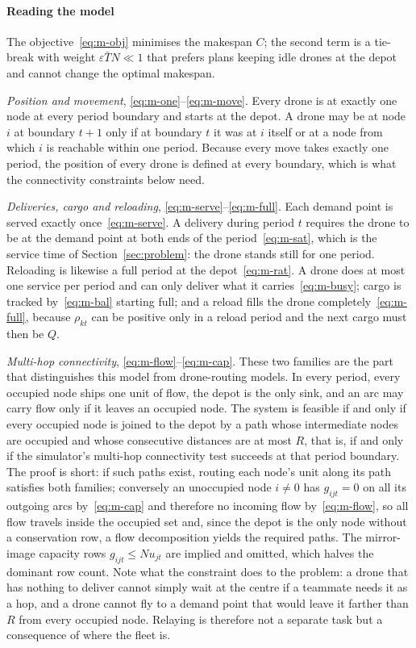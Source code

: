 \documentclass[final,5p,times,twocolumn]{elsarticle}
\begin{document}
\paragraph{Reading the model}
The objective~\eqref{eq:m-obj} minimises the makespan $C$; the second term is a tie-break with
weight $\varepsilon \bar T N \ll 1$ that prefers plans keeping idle drones at the depot and
cannot change the optimal makespan.

\emph{Position and movement}, \eqref{eq:m-one}--\eqref{eq:m-move}. Every drone is at exactly one
node at every period boundary and starts at the depot. A drone may be at node $i$ at boundary
$t+1$ only if at boundary $t$ it was at $i$ itself or at a node from which $i$ is reachable within
one period. Because every move takes exactly one period, the position of every drone is defined at
every boundary, which is what the connectivity constraints below need.

\emph{Deliveries, cargo and reloading}, \eqref{eq:m-serve}--\eqref{eq:m-full}. Each demand point
is served exactly once~\eqref{eq:m-serve}. A delivery during period $t$ requires the drone to be
at the demand point at both ends of the period~\eqref{eq:m-sat}, which is the service time of
Section~\ref{sec:problem}: the drone stands still for one period. Reloading is likewise a full
period at the depot~\eqref{eq:m-rat}. A drone does at most one service per period and can only
deliver what it carries~\eqref{eq:m-busy}; cargo is tracked by~\eqref{eq:m-bal} starting full; and
a reload fills the drone completely~\eqref{eq:m-full}, because $\rho_{kt}$ can be positive only in
a reload period and the next cargo must then be $Q$.

\emph{Multi-hop connectivity}, \eqref{eq:m-flow}--\eqref{eq:m-cap}. These two families are the
part that distinguishes this model from drone-routing models. In every period, every occupied node
ships one unit of flow, the depot is the only sink, and an arc may carry flow only if it leaves an
occupied node. The system is feasible if and only if every occupied node is joined to the depot by
a path whose intermediate nodes are occupied and whose consecutive distances are at most $R$,
that is, if and only if the simulator's multi-hop connectivity test succeeds at that period
boundary. The proof is short: if such paths exist, routing each node's unit along its path
satisfies both families; conversely an unoccupied node $i \ne 0$ has $g_{ijt} = 0$ on all its
outgoing arcs by~\eqref{eq:m-cap} and therefore no incoming flow by~\eqref{eq:m-flow}, so all
flow travels inside the occupied set and, since the depot is the only node without a conservation
row, a flow decomposition yields the required paths. The mirror-image capacity rows
$g_{ijt} \le N u_{jt}$ are implied and omitted, which halves the dominant row count. Note what the
constraint does to the problem: a drone that has nothing to deliver cannot simply wait at the
centre if a teammate needs it as a hop, and a drone cannot fly to a demand point that would leave
it farther than $R$ from every occupied node. Relaying is therefore not a separate task but a
consequence of where the fleet is.
\end{document}
